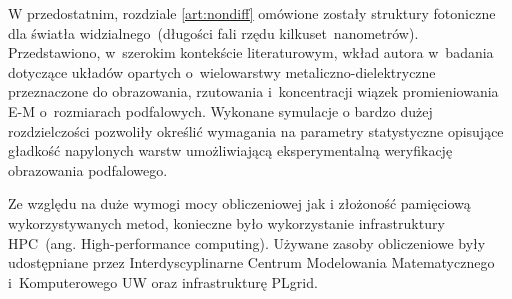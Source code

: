 W przedostatnim,  rozdziale \ref{art:nondiff}  omówione zostały struktury fotoniczne dla światła widzialnego~(długości fali rzędu kilkuset~nanometrów). Przedstawiono, w~szerokim kontekście literaturowym, wkład autora w~badania dotyczące układów opartych o~wielowarstwy metaliczno-dielektryczne przeznaczone do obrazowania, rzutowania i~koncentracji wiązek promieniowania E-M o~rozmiarach podfalowych. Wykonane symulacje o bardzo dużej rozdzielczości pozwoliły określić wymagania na parametry statystyczne opisujące gładkość napylonych warstw umożliwiającą eksperymentalną weryfikację obrazowania podfalowego.

Ze względu na duże wymogi mocy obliczeniowej jak i złożoność pamięciową wykorzystywanych metod, konieczne było wykorzystanie infrastruktury HPC~(ang. High-performance computing). Używane zasoby obliczeniowe były udostępniane przez Interdyscyplinarne Centrum Modelowania Matematycznego i~Komputerowego UW oraz infrastrukturę PLgrid. 
